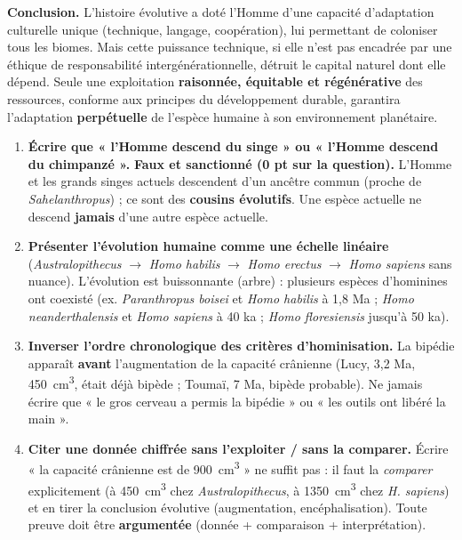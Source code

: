 \documentclass[11pt]{article}
\newcommand{\cle}[1]{{\popxbold\color{popdark}#1}}
\begin{document}
\begin{exoresolu}
\begin{enumerate}
\end{enumerate}
\textbf{Conclusion.} L'histoire évolutive a doté l'Homme d'une capacité d'adaptation culturelle unique (technique, langage, coopération), lui permettant de coloniser tous les biomes. Mais cette puissance technique, si elle n'est pas encadrée par une éthique de responsabilité intergénérationnelle, détruit le capital naturel dont elle dépend. Seule une exploitation \textbf{raisonnée, équitable et régénérative} des ressources, conforme aux principes du \cle{développement durable}, garantira l'adaptation \textbf{perpétuelle} de l'espèce humaine à son environnement planétaire.
\end{exoresolu}

\begin{attention}
\begin{enumerate}
\item \textbf{Écrire que « l'Homme descend du singe » ou « l'Homme descend du chimpanzé ».} \textbf{Faux et sanctionné (0 pt sur la question).} L'Homme et les grands singes actuels descendent d'un \cle{ancêtre commun} (proche de \emph{Sahelanthropus}) ; ce sont des \textbf{cousins évolutifs}. Une espèce actuelle ne descend \textbf{jamais} d'une autre espèce actuelle.
\item \textbf{Présenter l'évolution humaine comme une échelle linéaire} (\emph{Australopithecus} $\rightarrow$ \emph{Homo habilis} $\rightarrow$ \emph{Homo erectus} $\rightarrow$ \emph{Homo sapiens} sans nuance). L'évolution est \cle{buissonnante} (arbre) : plusieurs espèces d'hominines ont coexisté (ex. \emph{Paranthropus boisei} et \emph{Homo habilis} à 1,8 Ma ; \emph{Homo neanderthalensis} et \emph{Homo sapiens} à 40 ka ; \emph{Homo floresiensis} jusqu'à 50 ka).
\item \textbf{Inverser l'ordre chronologique des critères d'hominisation.} La \cle{bipédie} apparaît \textbf{avant} l'augmentation de la capacité crânienne (Lucy, 3,2 Ma, \SI{450}{cm^3}, était déjà bipède ; Toumaï, 7 Ma, bipède probable). Ne jamais écrire que « le gros cerveau a permis la bipédie » ou « les outils ont libéré la main ».
\item \textbf{Citer une donnée chiffrée sans l'exploiter / sans la comparer.} Écrire « la capacité crânienne est de \SI{900}{cm^3} » ne suffit pas : il faut la \emph{comparer} explicitement (à \SI{450}{cm^3} chez \emph{Australopithecus}, à \SI{1350}{cm^3} chez \emph{H. sapiens}) et en tirer la conclusion évolutive (augmentation, encéphalisation). Toute preuve doit être \textbf{argumentée} (donnée + comparaison + interprétation).

\end{enumerate}
\end{attention}
\end{document}
